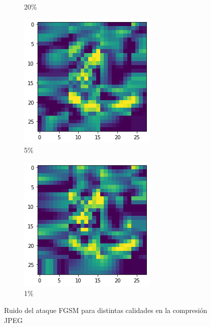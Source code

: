 \begin{figure}[h]
\begin{subfigure}[t]{0.22\textwidth}
    \caption{20\%}
    \label{fgsm_jpeg}
\end{subfigure}
\hspace{1em}
\begin{subfigure}[t]{0.22\textwidth}
\centering
    \includegraphics[width=\textwidth]{images/jpeg/fgsm_jpeg5_Le.png}
    \caption{5\%}
    \label{fgsm_jpeg}
\end{subfigure}
\hspace{1em}
\begin{subfigure}[t]{0.22\textwidth}
\centering
    \includegraphics[width=\textwidth]{images/jpeg/fgsm_jpeg1_Le.png}
    \caption{1\%}
    \label{fgsm_jpeg1}
\end{subfigure}
\caption{Ruido del ataque FGSM para distintas calidades en la compresión JPEG}
\label{Noise}
\end{figure}

